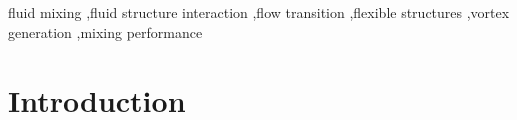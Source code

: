 \documentclass[reprint,a4paper,fleqn]{cas-dc} %
\begin{document}
\begin{abstract}

	\end{abstract}

	

	
	\begin{keywords}
		fluid mixing \sep fluid structure interaction \sep flow transition \sep flexible structures \sep vortex generation \sep mixing performance
	\end{keywords}

	\maketitle

	\section{Introduction}
	\label{sec:headings}
\end{document}
